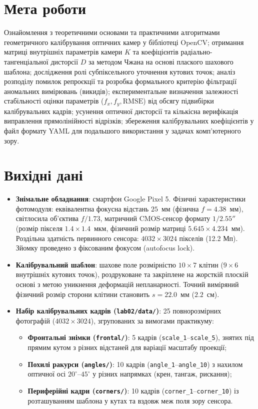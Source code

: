 \documentclass[14pt, a4paper]{extarticle}
\begin{document}


\section{Мета роботи}
Ознайомлення з теоретичними основами та практичними алгоритмами геометричного калібрування оптичних камер у бібліотеці OpenCV; отримання матриці внутрішніх параметрів камери $K$ та коефіцієнтів радіально-тангенціальної дисторсії $D$ за методом Чжана на основі плаского шахового шаблона; дослідження ролі субпіксельного уточнення кутових точок; аналіз розподілу помилок репроєкції та розробка формального критерію фільтрації аномальних вимірювань (викидів); експериментальне визначення залежності стабільності оцінки параметрів ($f_x, f_y, \text{RMSE}$) від обсягу підвибірки калібрувальних кадрів; усунення оптичної дисторсії та кількісна верифікація виправлення прямолінійності відрізків; збереження калібрувальних коефіцієнтів у файл формату YAML для подальшого використання у задачах комп'ютерного зору.

\section{Вихідні дані}
\begin{itemize}
    \item \textbf{Знімальне обладнання}: смартфон Google Pixel 5. Фізичні характеристики фотомодуля: еквівалентна фокусна відстань $25$~мм (фізична $f = 4.38$~мм), світлосила об'єктива $f/1.73$, матричний CMOS-сенсор формату $1/2.55''$ (розмір пікселя $1.4 \times 1.4$~мкм, фізичний розмір матриці $5.645 \times 4.234$~мм). Роздільна здатність первинного сенсора: $4032 \times 3024$ пікселів (12.2 Мп). Зйомку проведено з фіксованим фокусом (autofocus lock).
    \item \textbf{Калібрувальний шаблон}: шахове поле розмірністю $10 \times 7$ клітин ($9 \times 6$ внутрішніх кутових точок), роздруковане та закріплене на жорсткій плоскій основі з метою уникнення деформацій непланарності. Точний виміряний фізичний розмір сторони клітини становить $s = 22.0$~мм ($2.2$~см).
    \item \textbf{Набір калібрувальних кадрів (\texttt{lab02/data/})}: 25 повнорозмірних фотографій ($4032 \times 3024$), згрупованих за вимогами практикуму:
    \begin{itemize}
        \item \textbf{Фронтальні знімки (\texttt{frontal/})}: 5 кадрів (\texttt{scale\_1}--\texttt{scale\_5}), знятих під прямим кутом з різних відстаней для варіації масштабу проекції;
        \item \textbf{Похилі ракурси (\texttt{angles/})}: 10 кадрів (\texttt{angle\_1}--\texttt{angle\_10}) з нахилом оптичної осі $20^\circ$--$45^\circ$ у різних напрямках (крен, тангаж, рискання);
        \item \textbf{Периферійні кадри (\texttt{corners/})}: 10 кадрів (\texttt{corner\_1}--\texttt{corner\_10}) із розташуванням шаблона у кутах та вздовж меж поля зору сенсора.
    \end{itemize}
\end{itemize}
\end{document}
